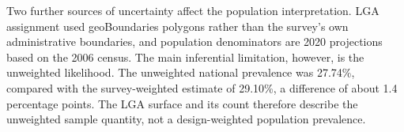 Two further sources of uncertainty affect the population interpretation. LGA assignment used geoBoundaries polygons rather than the survey's own administrative boundaries, and population denominators are 2020 projections based on the 2006 census. The main inferential limitation, however, is the unweighted likelihood. The unweighted national prevalence was 27.74\%, compared with the survey-weighted estimate of 29.10\%, a difference of about 1.4 percentage points. The LGA surface and its count therefore describe the unweighted sample quantity, not a design-weighted population prevalence.
